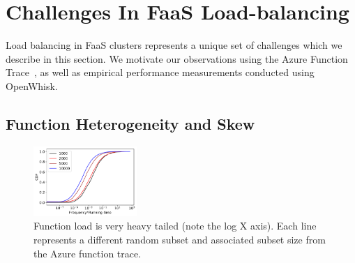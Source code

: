 
\section{Challenges In FaaS Load-balancing}
\label{sec:challenges}
Load balancing in FaaS clusters represents a unique set of challenges which we describe in this section.
We motivate our observations using the Azure Function Trace~\cite{shahrad_serverless_2020}, as well as empirical performance measurements conducted using OpenWhisk.  



\vspace*{-0.2cm}
\subsection{Function Heterogeneity and Skew}


\begin{figure}
  \includegraphics[width=0.35\textwidth]{../figs/freqs-all.pdf}
    \vspace*{-0.2cm}
  \caption{Function load is very heavy tailed (note the log X axis). Each line represents a different random subset and associated subset size from the Azure function trace. }
  \label{fig:freqs}
    \vspace*{-0.2cm}
\end{figure}

